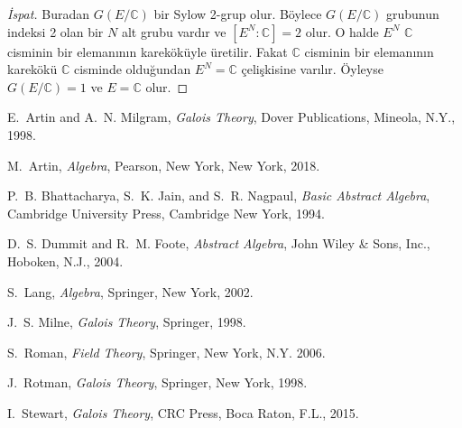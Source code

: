 \documentclass{article}
\theoremstyle{definition}
\theoremstyle{remark}
\begin{document}
\begin{proof}[İspat]
    			Buradan $G(E/\mathbb{C})$ bir Sylow 2-grup olur. Böylece $G(E/\mathbb{C})$ grubunun indeksi 2 olan bir $N$ alt grubu vardır ve $[E^N : \mathbb{C}] = 2$ olur. O halde $E^N$ $\mathbb{C}$ cisminin bir elemanının kareköküyle üretilir. Fakat $\mathbb{C}$ cisminin bir elemanının karekökü $\mathbb{C}$ cisminde olduğundan $E^N = \mathbb{C}$ çelişkisine varılır. Öyleyse $G(E/\mathbb{C}) = 1$ ve $E = \mathbb{C}$ olur.
    	    \end{proof}
	        
\newpage

    \begin{thebibliography}{10}
    
			E.~Artin and A.~N. Milgram, \emph{Galois Theory}, Dover Publications, Mineola, N.Y., 1998.
			
			M.~Artin, \emph{Algebra}, Pearson, New York, New York, 2018.
			
			P.~B. Bhattacharya, S.~K. Jain, and S.~R. Nagpaul, \emph{Basic Abstract Algebra}, Cambridge University Press, Cambridge New York, 1994.
			
			D.~S. Dummit and R.~M. Foote, \emph{Abstract Algebra}, John Wiley \& Sons, Inc., Hoboken, N.J., 2004.
			
			S.~Lang, \emph{Algebra}, Springer, New York, 2002.
			
			J.~S. Milne, \emph{Galois Theory}, Springer, 1998.
			
			S.~Roman, \emph{Field Theory}, Springer, New York, N.Y. 2006.
			
			J.~Rotman, \emph{Galois Theory}, Springer, New York, 1998.
			
			I.~Stewart, \emph{Galois Theory}, CRC Press, Boca Raton, F.L., 2015.
    	
    \end{thebibliography}
	
\end{document}
